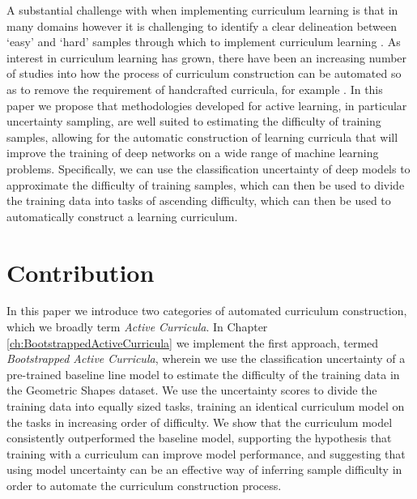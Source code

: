 A substantial challenge with when implementing curriculum learning is that in many domains however it is challenging to identify a clear delineation between `easy' and `hard' samples through which to implement curriculum learning \cite{Bengio2009} \cite{graves2017automated}. As interest in curriculum learning has grown, there have been an increasing number of studies into how the process of curriculum construction can be automated so as to remove the requirement of handcrafted curricula, for example \cite{graves2017automated} \cite{jiang2015self} \cite{pentina2015curriculum} \cite{weinshall2018curriculum}. In this paper we propose that methodologies developed for active learning, in particular uncertainty sampling, are well suited to estimating the difficulty of training samples, allowing for the automatic construction of learning curricula that will improve the training of deep networks on a wide range of machine learning problems. Specifically, we can use the classification uncertainty of deep models to approximate the difficulty of training samples, which can then be used to divide the training data into tasks of ascending difficulty, which can then be used to automatically construct a learning curriculum.
\section{Contribution}
In this paper we introduce two categories of automated curriculum construction, which we broadly term \textit{Active Curricula}. In Chapter \ref{ch:BootstrappedActiveCurricula} we implement the first approach, termed \textit{Bootstrapped Active Curricula}, wherein we use the classification uncertainty of a pre-trained baseline line model to estimate the difficulty of the training data in the Geometric Shapes \cite{GeoShapes} dataset. We use the uncertainty scores to divide the training data into equally sized tasks, training an identical curriculum model on the tasks in increasing order of difficulty. We show that the curriculum model consistently outperformed the baseline model, supporting the hypothesis that training with a curriculum can improve model performance, and suggesting that using model uncertainty can be an effective way of inferring sample difficulty in order to automate the curriculum construction process. 

